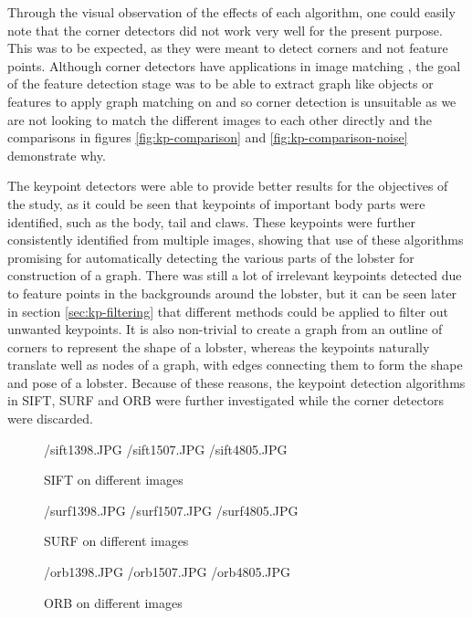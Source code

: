 \noindent
Through the visual observation of the effects of each algorithm, one could easily note that the corner detectors did not work very well for the present purpose. This was to be expected, as they were meant to detect corners and not feature points. Although corner detectors have applications in image matching \cite{corner-detection}, the goal of the feature detection stage was to be able to extract graph like objects or features to apply graph matching on and so corner detection is unsuitable as we are not looking to match the different images to each other directly and the comparisons in figures \ref{fig:kp-comparison} and \ref{fig:kp-comparison-noise} demonstrate why.

The keypoint detectors were able to provide better results for the objectives of the study, as it could be seen that keypoints of important body parts were identified, such as the body, tail and claws. These keypoints were further consistently identified from multiple images, showing that use of these algorithms promising for automatically detecting the various parts of the lobster for construction of a graph. There was still a lot of irrelevant keypoints detected due to feature points in the backgrounds around the lobster, but it can be seen later in section \ref{sec:kp-filtering} that different methods could be applied to filter out unwanted keypoints. It is also non-trivial to create a graph from an outline of corners to represent the shape of a lobster, whereas the keypoints naturally translate well as nodes of a graph, with edges connecting them to form the shape and pose of a lobster. Because of these reasons, the keypoint detection algorithms in SIFT, SURF and ORB were further investigated while the corner detectors were discarded.

\begin{figure}[H]
\centering
\threefig
{\imgpath/sift1398.JPG}{}
{\imgpath/sift1507.JPG}{}
{\imgpath/sift4805.JPG}{}
\caption{SIFT on different images}
\end{figure}	


\begin{figure}[H]
  \threefig
  {\imgpath/surf1398.JPG}{}
  {\imgpath/surf1507.JPG}{}
  {\imgpath/surf4805.JPG}{}
\caption{SURF on different images}
\end{figure}


\begin{figure}[H]
  \threefig
  {\imgpath/orb1398.JPG}{}
  {\imgpath/orb1507.JPG}{}
  {\imgpath/orb4805.JPG}{}
\caption{ORB on different images}
\end{figure}

